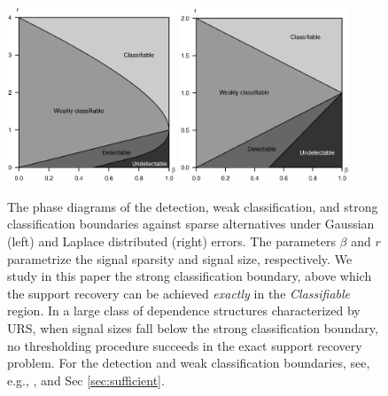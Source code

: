 \begin{figure}
      \centering
      \includegraphics[width=0.45\textwidth]{./figures/phase_diagram_Gaussian_no_dashed_area.eps}
      \includegraphics[width=0.45\textwidth]{./figures/phase_diagram_double_exponential.eps}
      \caption{The phase diagrams of the detection, weak classification, and strong classification boundaries against sparse alternatives under Gaussian (left) and Laplace distributed (right) errors. The parameters $\beta$ and $r$ parametrize the signal sparsity and signal size, respectively.
      We study in this paper the strong classification boundary, above which the support recovery can be achieved \emph{exactly} in the \emph{Classifiable} region. In a large class of dependence structures characterized by URS, when signal sizes fall below the strong classification boundary, no thresholding procedure succeeds in the exact support recovery problem.
      For the detection and weak classification boundaries, see, e.g., \citep{haupt2011distilled, arias2017distribution, ingster1998minimax, donoho2004higher}, and Sec \ref{sec:sufficient}.}
      \label{fig:phase}
\end{figure}

